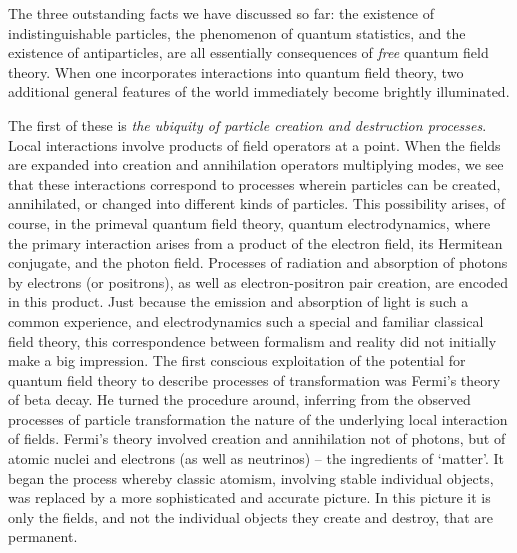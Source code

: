 \documentclass[12pt]{article}
\begin{document}
The three outstanding facts we have
discussed so far: the existence of indistinguishable particles, the
phenomenon of quantum statistics, and the existence of antiparticles,
are all essentially consequences of {\it free\/} quantum field theory.
When one incorporates interactions into quantum field theory, two
additional general features of the world immediately become brightly
illuminated.  

The first of these is {\it the ubiquity of particle
creation and destruction processes}.  Local interactions involve
products of field operators at a point.  When the fields are expanded
into creation and annihilation operators multiplying modes, we see
that these interactions correspond to processes wherein particles can
be created, annihilated, or changed into different kinds of particles.
This possibility arises, of course, in the primeval quantum field
theory, quantum electrodynamics, where the primary interaction arises
from a product of the electron field, its Hermitean conjugate, and the
photon field.  Processes of radiation and absorption of photons by
electrons (or positrons), as well as electron-positron pair creation,
are encoded in this product. Just because the emission and absorption
of light is such a common experience, and electrodynamics such a
special and familiar classical field theory, this correspondence
between formalism and reality did not initially make a big
impression. The first conscious exploitation of the potential for
quantum field theory to describe processes of transformation was
Fermi's theory of beta decay.  He turned the procedure around,
inferring from the observed processes of particle transformation the
nature of the underlying local interaction of fields.  Fermi's
theory involved creation and annihilation not of photons, but of
atomic nuclei and electrons (as well as neutrinos) -- the ingredients
of `matter'.  It began the process whereby classic atomism,
involving stable individual objects, was replaced by a more
sophisticated and accurate picture.  In this picture it is only the
fields, and not the individual objects they create and destroy, that
are permanent.  
\end{document}
